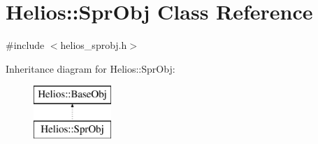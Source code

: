 \hypertarget{class_helios_1_1_spr_obj}{}\section{Helios\+:\+:Spr\+Obj Class Reference}
\label{class_helios_1_1_spr_obj}


{\ttfamily \#include $<$helios\+\_\+sprobj.\+h$>$}

Inheritance diagram for Helios\+:\+:Spr\+Obj\+:\begin{figure}[H]
\begin{center}
\leavevmode
\includegraphics[height=2.000000cm]{class_helios_1_1_spr_obj}
\end{center}
\end{figure}
